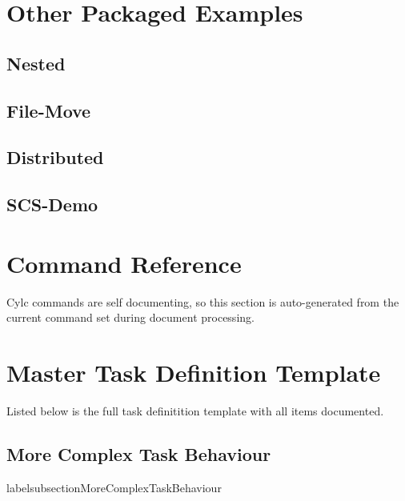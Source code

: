 \documentclass[11pt,a4paper]{article}
\begin{document}
\section{Other Packaged Examples}
\label{OtherPackagedExamples}

\subsection{Nested}

\subsection{File-Move}

\subsection{Distributed}

\subsection{SCS-Demo}

\section{Command Reference}
\label{CommandReference}

Cylc commands are self documenting, so this section is auto-generated
from the current command set during document processing.

\lstset{language=usage}



\section{Master Task Definition Template}
\label{MasterTaskDefinitionTemplate}

Listed below is the full task definitition template with all items
documented.

\lstset{language=cylctaskdef}



\lstset{language=}

\pagebreak
\subsection{More Complex Task Behaviour}
labelsubsection{MoreComplexTaskBehaviour}
\end{document}

